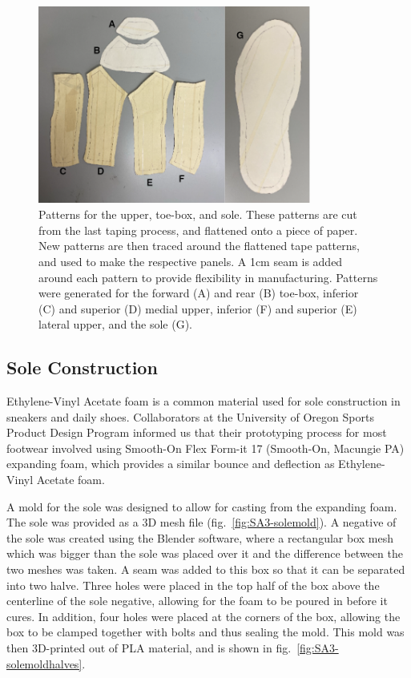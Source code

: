 \documentclass[defaultstyle,11pt]{comps}
\begin{document}
\begin{figure}
\hypertarget{fig:SA3-cutpatterns}{%
\centering
\includegraphics[width=0.8\textwidth,height=\textheight]{../fig/SA3/cut_patterns.png}
\caption{Patterns for the upper, toe-box, and sole. These patterns are cut from the last taping process, and flattened onto a piece of paper. New patterns are then traced around the flattened tape patterns, and used to make the respective panels. A 1cm seam is added around each pattern to provide flexibility in manufacturing. Patterns were generated for the forward (A) and rear (B) toe-box, inferior (C) and superior (D) medial upper, inferior (F) and superior (E) lateral upper, and the sole (G).}\label{fig:SA3-cutpatterns}
}
\end{figure}

\hypertarget{sole-construction}{%
\subsection{Sole Construction}\label{sole-construction}}

Ethylene-Vinyl Acetate foam is a common material used for sole construction in sneakers and daily shoes.
Collaborators at the University of Oregon Sports Product Design Program informed us that their prototyping process for most footwear involved using Smooth-On Flex Form-it 17 (Smooth-On, Macungie PA) expanding foam, which provides a similar bounce and deflection as Ethylene-Vinyl Acetate foam.

A mold for the sole was designed to allow for casting from the expanding foam.
The sole was provided as a 3D mesh file (fig.~\ref{fig:SA3-solemold}).
A negative of the sole was created using the Blender software, where a rectangular box mesh which was bigger than the sole was placed over it and the difference between the two meshes was taken.
A seam was added to this box so that it can be separated into two halve.
Three holes were placed in the top half of the box above the centerline of the sole negative, allowing for the foam to be poured in before it cures.
In addition, four holes were placed at the corners of the box, allowing the box to be clamped together with bolts and thus sealing the mold.
This mold was then 3D-printed out of PLA material, and is shown in fig.~\ref{fig:SA3-solemoldhalves}.
\end{document}
